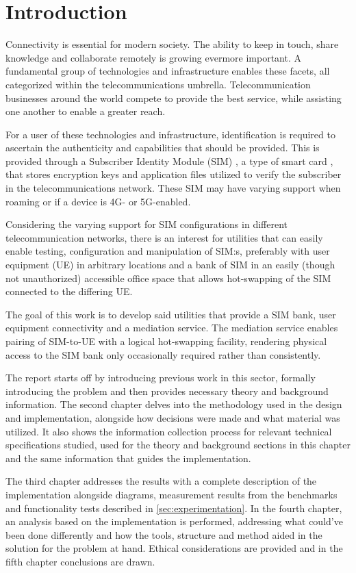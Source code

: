 \chapter{Introduction}

Connectivity is essential for modern society. The ability to keep in
touch, share knowledge and collaborate remotely is growing evermore
important. A fundamental group of technologies and infrastructure
enables these facets, all categorized within the telecommunications
umbrella. Telecommunication businesses around the world compete to
provide the best service, while assisting one another to enable a
greater reach.

For a user of these technologies and infrastructure, identification
is required to ascertain the authenticity and capabilities that
should be provided. This is provided through a Subscriber Identity
Module (SIM) \cite{sim}, a type of smart card \cite{smart-card},
that stores encryption keys and application files utilized to verify
the subscriber in the telecommunications network. These SIM may have
varying support when roaming or if a device is 4G- or 5G-enabled.

Considering the varying support for SIM configurations in different
telecommunication networks, there is an interest for utilities that
can easily enable testing, configuration and manipulation of SIM:s,
preferably with user equipment (UE) in arbitrary locations and a bank
of SIM in an easily (though not unauthorized) accessible office space
that allows hot-swapping of the SIM connected to the differing UE.

The goal of this work is to develop said utilities that provide a
SIM bank, user equipment connectivity and a mediation service. The
mediation service enables pairing of SIM-to-UE with a logical
hot-swapping facility, rendering physical access to the SIM bank
only occasionally required rather than consistently.

The report starts off by introducing previous work in this sector,
formally introducing the problem and then provides necessary theory
and background information. The second chapter delves into the
methodology used in the design and implementation, alongside how
decisions were made and what material was utilized. It also shows
the information collection process for relevant technical
specifications studied, used for the theory and background sections
in this chapter and the same information that guides the
implementation.

The third chapter addresses the results with a complete description
of the implementation alongside diagrams, measurement results from
the benchmarks and functionality tests described in \ref{sec:experimentation}.
In the fourth chapter, an analysis based on the implementation is
performed, addressing what could've been done differently and how
the tools, structure and method aided in the solution for the
problem at hand. Ethical considerations are provided and in the
fifth chapter conclusions are drawn.

